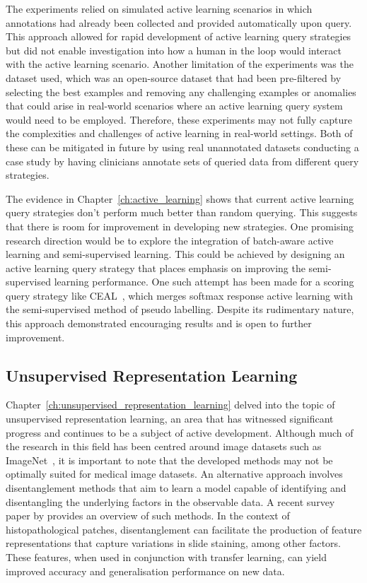 The experiments relied on simulated active learning scenarios in which annotations had already been collected and provided automatically upon query. This approach allowed for rapid development of active learning query strategies but did not enable investigation into how a human in the loop would interact with the active learning scenario. Another limitation of the experiments was the dataset used, which was an open-source dataset that had been pre-filtered by selecting the best examples and removing any challenging examples or anomalies that could arise in real-world scenarios where an active learning query system would need to be employed. Therefore, these experiments may not fully capture the complexities and challenges of active learning in real-world settings. Both of these can be mitigated in future by using real unannotated datasets conducting a case study by having clinicians annotate sets of queried data from different query strategies.

The evidence in Chapter~\ref{ch:active_learning} shows that current active learning query strategies don’t perform much better than random querying. This suggests that there is room for improvement in developing new strategies. One promising research direction would be to explore the integration of batch-aware active learning and semi-supervised learning. This could be achieved by designing an active learning query strategy that places emphasis on improving the semi-supervised learning performance. One such attempt has been made for a scoring query strategy like CEAL~\citep{wang2016cost}, which merges softmax response active learning with the semi-supervised method of pseudo labelling. Despite its rudimentary nature, this approach demonstrated encouraging results and is open to further improvement.


\subsection{Unsupervised Representation Learning}
Chapter~\ref{ch:unsupervised_representation_learning} delved into the topic of unsupervised representation learning, an area that has witnessed significant progress and continues to be a subject of active development. Although much of the research in this field has been centred around image datasets such as ImageNet~\citep{deng2009imagenet}, it is important to note that the developed methods may not be optimally suited for medical image datasets. An alternative approach involves disentanglement methods that aim to learn a model capable of identifying and disentangling the underlying factors in the observable data. A recent survey paper by \cite{liu2022learning} provides an overview of such methods. In the context of histopathological patches, disentanglement can facilitate the production of feature representations that capture variations in slide staining, among other factors. These features, when used in conjunction with transfer learning, can yield improved accuracy and generalisation performance on new data.


